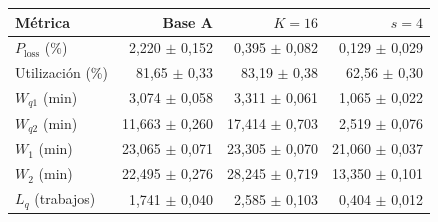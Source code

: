 \begin{tabular}{lrrr}
\toprule
Métrica & Base A & $K=16$ & $s=4$ \\
\midrule
$P_{\text{loss}}$ (\%) & 2,220 $\pm$ 0,152 & 0,395 $\pm$ 0,082 & 0,129 $\pm$ 0,029 \\
Utilización (\%) & 81,65 $\pm$ 0,33 & 83,19 $\pm$ 0,38 & 62,56 $\pm$ 0,30 \\
$W_{q1}$ (min) & 3,074 $\pm$ 0,058 & 3,311 $\pm$ 0,061 & 1,065 $\pm$ 0,022 \\
$W_{q2}$ (min) & 11,663 $\pm$ 0,260 & 17,414 $\pm$ 0,703 & 2,519 $\pm$ 0,076 \\
$W_1$ (min) & 23,065 $\pm$ 0,071 & 23,305 $\pm$ 0,070 & 21,060 $\pm$ 0,037 \\
$W_2$ (min) & 22,495 $\pm$ 0,276 & 28,245 $\pm$ 0,719 & 13,350 $\pm$ 0,101 \\
$L_q$ (trabajos) & 1,741 $\pm$ 0,040 & 2,585 $\pm$ 0,103 & 0,404 $\pm$ 0,012 \\
\bottomrule
\end{tabular}
